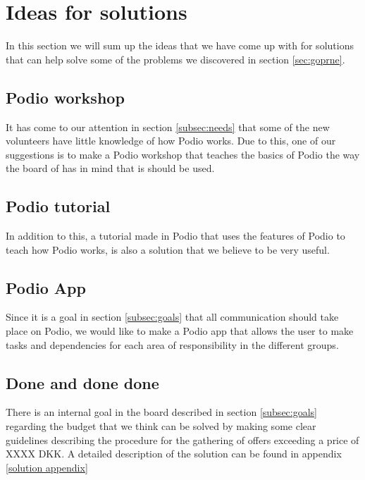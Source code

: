 \section{Ideas for solutions}
\label{sec:ideas}
In this section we will sum up the ideas that we have come up with for solutions
that can help solve some of the problems we discovered in section \ref{sec:goprne}.

\subsection{Podio workshop}
It has come to our attention in section \ref{subsec:needs} that
some of the new volunteers have little knowledge of how Podio works. Due to
this, one of our suggestions is to make a Podio workshop that teaches the basics
of Podio the way the board of \mil has in mind that is should be used.

\subsection{Podio tutorial}
In addition to this, a tutorial made in Podio that uses the features of Podio to
teach how Podio works, is also a solution that we believe to be very useful.

\subsection{Podio App}
Since it is a goal in section \ref{subsec:goals} that all communication should take place
on Podio, we would like to make a Podio app that allows the user to make tasks
and dependencies for each area of responsibility in the different groups.

\subsection{Done and done done}
There is an internal goal in the board described in section \ref{subsec:goals} regarding the
budget that we think can be solved by making some clear guidelines describing
the procedure for the gathering of offers exceeding a price of XXXX DKK. A
detailed description of the solution can be found in appendix \ref{solution
appendix}

